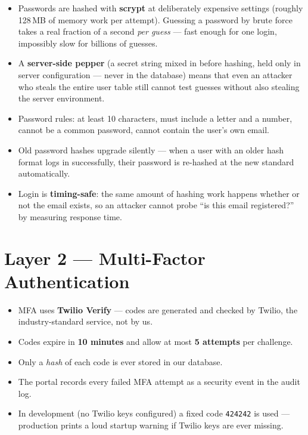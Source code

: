 \documentclass[11pt,letterpaper]{report}
\begin{document}
\begin{itemize}[leftmargin=1.4em]
  \item Passwords are hashed with \textbf{scrypt} at deliberately expensive
        settings (roughly 128\,MB of memory work per attempt). Guessing a
        password by brute force takes a real fraction of a second \emph{per
        guess} --- fast enough for one login, impossibly slow for billions of
        guesses.
  \item A \textbf{server-side pepper} (a secret string mixed in before hashing,
        held only in server configuration --- never in the database) means that
        even an attacker who steals the entire user table still cannot test
        guesses without also stealing the server environment.
  \item Password rules: at least 10 characters, must include a letter and a
        number, cannot be a common password, cannot contain the user's own
        email.
  \item Old password hashes upgrade silently --- when a user with an older hash
        format logs in successfully, their password is re-hashed at the new
        standard automatically.
  \item Login is \textbf{timing-safe}: the same amount of hashing work happens
        whether or not the email exists, so an attacker cannot probe ``is this
        email registered?'' by measuring response time.
\end{itemize}

\section{Layer 2 --- Multi-Factor Authentication}

\begin{itemize}[leftmargin=1.4em]
  \item MFA uses \textbf{Twilio Verify} --- codes are generated and checked by
        Twilio, the industry-standard service, not by us.
  \item Codes expire in \textbf{10 minutes} and allow at most \textbf{5 attempts}
        per challenge.
  \item Only a \emph{hash} of each code is ever stored in our database.
  \item The portal records every failed MFA attempt as a security event in the
        audit log.
  \item In development (no Twilio keys configured) a fixed code
        \texttt{424242} is used --- production prints a loud startup warning if
        Twilio keys are ever missing.
\end{itemize}
\end{document}
